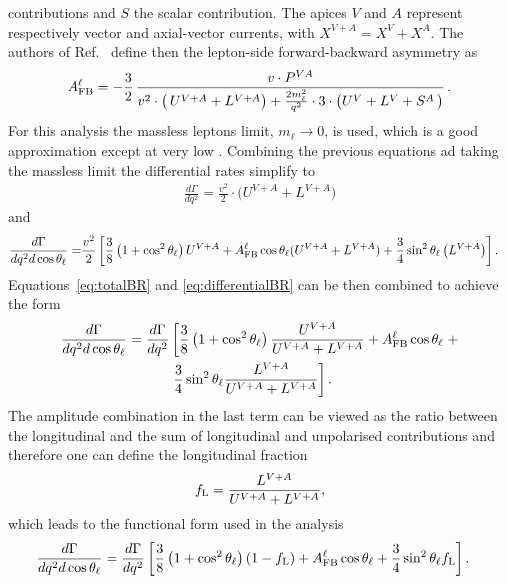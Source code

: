 contributions and $S$ the scalar contribution. The apices $V$ and $A$ represent respectively
vector and axial-vector currents, with $X^{V+A} = X^{V} + X^{A}$.
The authors of Ref.~\cite{Gutsche:2013pp} define then the lepton-side forward-backward asymmetry as
\begin{equation}
A_{\rm FB}^{\ell} 
= - \frac{3}{2}\,\frac{v\cdot P^{VA}}
{v^{2}\cdot\big(\,U^{V+A}
+L^{V+A}\big)+\frac{2m_{\ell}^{2}}{q^{2}}\cdot 3 \cdot
\big(U^{V}+L^{V}
+S^{A}\,\big) }\,.
\label{eq:afbDef}
\end{equation}
%
%
%
%
For this analysis the massless leptons limit, $m_\ell \rightarrow 0$, is used, which is a good
approximation except at very low \qsq. Combining the previous equations ad taking the massless 
limit the differential rates simplify to
\begin{eqnarray}
\frac{d\Gamma}{d q^2}=
\frac{v^{2}}{2}\cdot\bigg( U^{V+A} + L^{V+A} \bigg)
\label{eq:totalBR}
\end{eqnarray}
and
\begin{align}
\frac{d\Gamma}{dq^2d\cos\theta_\ell}=&
\frac{v^2}{2} \left[ \frac{3}{8}\left(1+\cos^2\theta_\ell\right)U^{V+A}+
A_{\rm FB}^\ell\cos\theta_\ell(U^{V+A} + L^{V+A})+
\frac{3}{4}\sin^2\theta_\ell \left(L^{V+A}\right) \right].
\label{eq:differentialBR}
\end{align}
%
%
Equations~\ref{eq:totalBR} and \ref{eq:differentialBR} can be then combined to achieve the form
\begin{align}
\frac{d\Gamma}{dq^2d\cos\theta_\ell}=
\frac{d\Gamma}{dq^2}&\left[
\frac{3}{8}\left(1+\cos^2\theta_\ell\right)\frac{U^{V+A}}{U^{V+A}+L^{V+A}}+A_{\rm FB}^\ell\cos\theta_\ell\right . +
 \nonumber \\
& \left. \frac{3}{4}\sin^2\theta_\ell\frac{L^{V+A}}{U^{V+A}+L^{V+A}}\right].
\end{align}
The amplitude combination in the last term can be viewed as the ratio between the longitudinal and the sum of
longitudinal and unpolarised contributions and therefore one can define the longitudinal fraction
\begin{equation}
f_{\rm L}=\frac{L^{V+A}}{U^{V+A}+L^{V+A}},
\end{equation}
which leads to the functional form used in the analysis
\begin{align}
\frac{d\Gamma}{dq^2d\cos\theta_\ell}=
\frac{d\Gamma}{dq^2}&\left[  \frac{3}{8}\left(1+\cos^2\theta_\ell\right)(1-f_{\rm L})+A_{\rm FB}^\ell\cos\theta_\ell +
   \frac{3}{4}\sin^2\theta_\ell f_{\rm L}\right]. 
   \label{eq:afbLTh}
\end{align}

